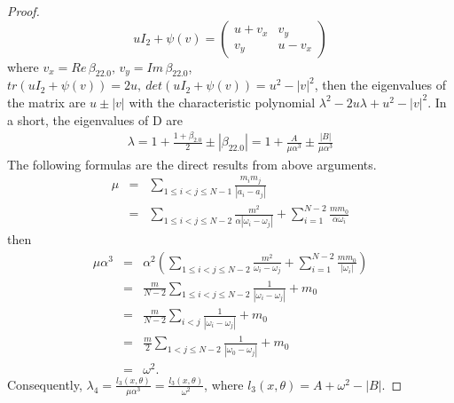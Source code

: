 \documentclass[11pt]{article}
\begin{document}
\begin{proof}
\begin{displaymath}
 uI_2+\psi(v)=\left(\begin{array}{cc}
 u+v_x&v_y\\
 v_y&u-v_x
 \end{array}
 \right)
 \end{displaymath}
 where $v_x=Re\,\beta_{22.0},\, v_y=Im\,\beta_{22.0}$, 
 $tr(uI_2+\psi(v))=2u,\ det(uI_2+\psi(v))=u^2-|v|^2$, then the eigenvalues of the matrix are $u\pm|v|$ with the characteristic polynomial $\lambda^2-2u\lambda+u^2-|v|^2$. In a short, the eigenvalues of D are
 \begin{eqnarray*}
 	\lambda=1+\frac{1+\beta_{2.0}}{2}\pm|\beta_{22.0}|=1+\frac{A}{\mu\alpha^3}\pm\frac{|B|}{\mu\alpha^3}
 \end{eqnarray*}
 The following formulas are the direct results from above arguments.
 \begin{eqnarray*}
 	\mu&=&\sum_{1\leq i<j\leq N-1}\frac{m_im_j}{|a_i-a_j|}\\
 	&=&\sum_{1\leq i<j\leq N-2}\frac{m^2}{\alpha|\omega_i-\omega_j|}+\sum_{i=1}^{N-2}\frac{mm_0}{\alpha\omega_i}
 \end{eqnarray*}
 then
 \begin{eqnarray*}
 	\mu\alpha^3&=&\alpha^2(\sum_{1\leq i<j\leq N-2}\frac{m^2}{\omega_i-\omega_j}+\sum_{i=1}^{N-2}\frac{mm_0}{|\omega_i|})
 	\\&=&\frac{m}{N-2}\sum_{1\leq i<j\leq N-2 }\frac{1}{|\omega_i-\omega_j|}+m_0
 	\\&=&\frac{m}{N-2}\sum_{i<j}\frac{1}{|\omega_i-\omega_j|}+m_0
 	\\&=&\frac{m}{2}\sum_{1<j\leq N-2}\frac{1}{|\omega_0-\omega_j|}+m_0
 	\\&=&\omega ^2.
 \end{eqnarray*}
 Consequently, $\lambda_4=\frac{l_3(x,\theta)}{\mu\alpha^3}
 =\frac{l_3(x,\theta)}{\omega^2}$, where $l_3(x,\theta)=A+\omega^2-|B|$.
\end{proof}
\end{document}
